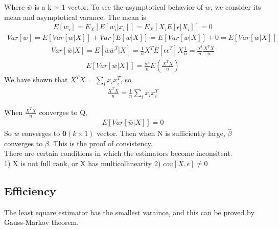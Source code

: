 \documentclass[a4paper]{article}
\begin{document}
Where $\bar w$ is a k $\times$ 1 vector. To see the asymptotical behavior of $w$, we consider its mean and asymptotical varance. The mean is
\begin{align*}
E[w_i]=E_X[E[w_i|x_i]] = E_X[X_iE[\epsilon|X_i]] = 0
\end{align*}
\begin{align*}
Var[\bar w]=E[Var[\bar w|X]]+Var[E[\bar w|X]] = E[Var[\bar w|X]]+0 = E[Var[\bar w|X]]
\end{align*}
\begin{align*}
Var[\bar w|X] = E[\bar w \bar w^T|X]=\frac{1}{n}X^TE[\epsilon \epsilon^T]X\frac{1}{n} = \frac{\sigma^2}{n}\frac{X^T X}{n}
\end{align*}
\begin{align*}
E[Var[\bar w|X]] = \frac{\sigma^2}{n}E(\frac{X^TX}{n})
\end{align*}
We have shown that $X^TX = \sum_i x_i x_i^T$, so 
\begin{align*}
\frac{X^TX}{n} = \frac{1}{n}\sum_i x_i x_i^T 
\end{align*}

When $\frac{X^TX}{n}$ converges to Q, 
\begin{align*}
E[Var[\bar w|X]] = 0
\end{align*} 
So $\bar w$ converges to $\boldsymbol 0(k \times 1)$ vector. Then when N is sufficiently large, $\hat \beta$ converges to $\beta$. This is the proof of consistency.\\
There are certain conditions in which the estimators become inconsitent.\\
1) X is not full rank, or X has multicollinearity
2) $cov[X, \epsilon] \neq 0$
\subsection{Efficiency}
The least equare estimator has the smallest varaince, and this can be proved by Gauss-Markov theorem. 
\end{document}
